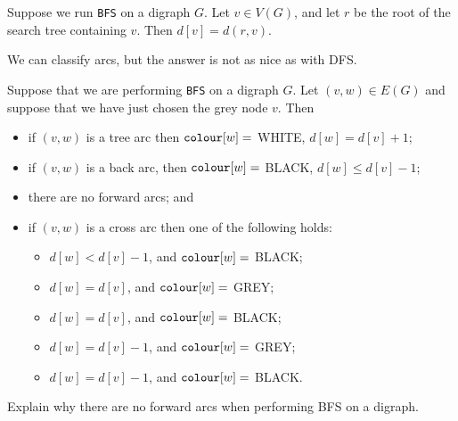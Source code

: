 \begin{Theorem} \label{thm:BFSdist}
Suppose we run \texttt{BFS} on a digraph $G$.
Let $v \in V(G)$, and let $r$ be the root of the search tree containing $v$. 
Then $d[v] = d(r, v)$.
\end{Theorem}

We can classify arcs, but the answer is not as nice as with DFS.

\begin{Theorem} \label{thm:BFS-arcclass}
Suppose that we are performing \texttt{BFS} on a digraph $G$. Let $(v,
w)\in E(G)$ and suppose that we have just chosen the grey node $v$. 
Then
\begin{itemize}
  \item if $(v, w)$ is a tree arc then $\operatorname{\text{\texttt{colour}}}[w] = $ WHITE, $d[w] = d[v] + 1$;
  \item if $(v, w)$ is a back arc, then $\operatorname{\text{\texttt{colour}}}[w] = $ BLACK, $d[w] \leq d[v] - 1$;  
  \item there are no forward arcs; and
  \item if $(v, w)$ is a cross arc then one of the following holds:
  \begin{itemize}
	\item $d[w] < d[v] - 1$, and $\operatorname{\text{\texttt{colour}}}[w] = $ BLACK;
	\item $d[w] = d[v]$, and $\operatorname{\text{\texttt{colour}}}[w] = $ GREY;
	\item $d[w] = d[v]$, and $\operatorname{\text{\texttt{colour}}}[w] = $ BLACK;
	\item $d[w] = d[v] - 1$, and $\operatorname{\text{\texttt{colour}}}[w] = $ GREY;
	\item $d[w] = d[v] - 1$, and $\operatorname{\text{\texttt{colour}}}[w] = $ BLACK.
  \end{itemize}
\end{itemize}
\end{Theorem}

\begin{Boxample}[6]
Explain why there are no forward arcs when performing BFS on a digraph.
\end{Boxample}

%
%

